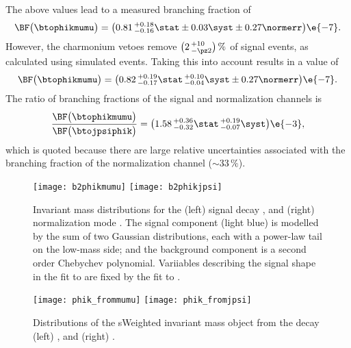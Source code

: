 The above values lead to a measured branching fraction of
\begin{equation}
  \BF\big(\btophikmumu\big)=
  \big(0.81\,^{+0.18}_{-0.16}\stat\pm0.03\syst\pm0.27\normerr\big)\e{-7}.
\end{equation}
However, the charmonium vetoes remove $\big(2\,^{+10}_{-\pz2}\big)\,\%$ of signal events, as
calculated using simulated events.
Taking this into account results in a value of
\begin{equation}
  \BF\big(\btophikmumu\big)=
  \big(0.82\,^{+0.19}_{-0.17}\stat\,^{+0.10}_{-0.04}\syst\pm0.27\normerr\big)\e{-7}.
\end{equation}
The ratio of branching fractions of the signal and normalization channels is
\begin{equation}
  \frac{ \BF\big(\btophikmumu\big) }{ \BF\big(\btojpsiphik\big) }
  =\big(1.58\,^{+0.36}_{-0.32}\stat\,^{+0.19}_{-0.07}\syst\big)\e{-3},
\end{equation}
which is quoted because there are large relative uncertainties associated with the branching
fraction of the normalization channel ($\sim33\,\%$).



\begin{figure}
  \begin{center}
    \texttt{[image: b2phikmumu]}
    \texttt{[image: b2phikjpsi]}
    \caption[Fits to \btokphimumu and \btojpsiphik]
    {\small
      Invariant mass distributions for the
      (left) signal decay \btophikmumu, and
      (right) normalization mode \btojpsiphik.
      The signal component (light blue) is modelled by the sum of two Gaussian distributions, each
      with a power-law tail on the low-mass side; and the background component is a second order
      Chebychev polynomial.
      Variiables describing the signal shape in the fit to \btophikmumu are fixed by the fit to
      \btojpsiphik.
    }
    \label{fig:phik:fit}
  \end{center}
\end{figure}


\begin{figure}
  \begin{center}
    \texttt{[image: phik\_frommumu]}
    \texttt{[image: phik\_fromjpsi]}
    \caption[Invariant mass distributions of \phik]
    {\small
      Distributions of the sWeighted invariant mass \phik object from the decay
      (left) \btophikmumu, and
      (right) \btojpsiphik.
    }
    \label{fig:phik:phik}
  \end{center}
\end{figure}




